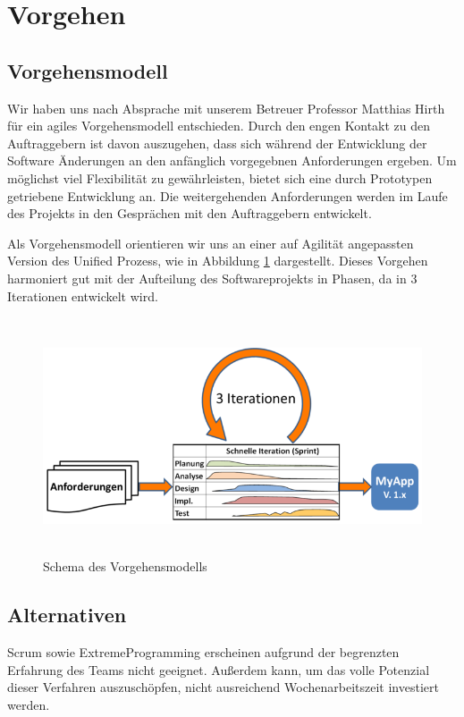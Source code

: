 \section{Vorgehen}
\subsection{Vorgehensmodell}
Wir haben uns nach Absprache mit unserem Betreuer Professor Matthias Hirth für ein agiles Vorgehensmodell entschieden. Durch den engen Kontakt zu den Auftraggebern ist davon auszugehen, dass sich während der Entwicklung der Software Änderungen an den anfänglich vorgegebnen Anforderungen ergeben. Um möglichst viel Flexibilität zu gewährleisten, bietet sich eine durch Prototypen getriebene Entwicklung an. Die weitergehenden Anforderungen werden im Laufe des Projekts in den Gesprächen mit den Auftraggebern entwickelt. \par
\vspace{0,5cm}
\noindent Als Vorgehensmodell orientieren wir uns an einer auf Agilität angepassten Version des Unified Prozess, wie in Abbildung \ref{fig:UPAgil} dargestellt. Dieses Vorgehen harmoniert gut mit der Aufteilung des Softwareprojekts in Phasen, da in 3 Iterationen entwickelt wird.

\begin{figure}[htp]
    \centering
    \includegraphics[width=14cm , height=7cm]{Kapitel/Bilder/AgileUnifiedProcess.png}
    \caption[Schema des Vorgehensmodells]{Schema des Vorgehensmodells\protect\footnotemark}
    \label{fig:UPAgil}
\end{figure}

\newpage

\subsection{Alternativen}
\noindent Scrum sowie ExtremeProgramming erscheinen aufgrund der begrenzten Erfahrung des Teams nicht geeignet. Außerdem kann, um das volle Potenzial dieser Verfahren auszuschöpfen, nicht ausreichend Wochenarbeitszeit investiert werden.

